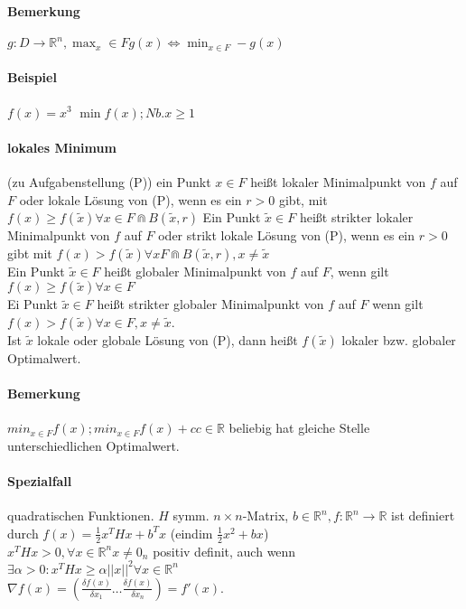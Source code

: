 \documentclass[ngerman,halfparskip]{scrartcl}
\theoremstyle{definition}
\def\R{\mathbb R}
\begin{document}
\paragraph*{Bemerkung} $g: D\rightarrow\R^n, \max_x\in F g(x) \Leftrightarrow \min_{x\in F} -g(x)$
\paragraph[1.1.3]{Beispiel}
$f(x)=x^3$ $\min f(x); Nb. x\geq 1$
\paragraph[Def 1.1.4]{lokales Minimum} (zu Aufgabenstellung (P)) ein Punkt $x\in F$ heißt lokaler Minimalpunkt von $f$ auf $F$ oder lokale Lösung von (P), wenn es ein $r>0$ gibt, mit $f(x)\geq f(\tilde x)\forall x\in F \Cap B(\tilde x,r)$ Ein Punkt $\tilde x\in F$ heißt strikter lokaler Minimalpunkt von $f$ auf $F$ oder strikt lokale Lösung von (P), wenn es ein $r>0$ gibt mit $f(x)>f(\tilde x)\forall x F\Cap B(\tilde x,r), x\neq \tilde x$ \\
Ein Punkt $\tilde{x} \in F$ heißt globaler Minimalpunkt von $f$ auf $F$, wenn gilt $f(x)\geq f(\tilde{x})\forall x\in F$\\
Ei Punkt $ \tilde x \in F$ heißt strikter globaler Minimalpunkt von $f$ auf $F$ wenn gilt $ f(x) >f(\tilde x) \forall x\in F, x\neq \tilde x$.\\
Ist $\tilde x$ lokale oder globale Lösung von (P), dann heißt $f(\tilde x)$ lokaler bzw. globaler Optimalwert.
\paragraph*{Bemerkung} $min_{x\in F} f(x); min_{x\in F} f(x)+c c\in\R$ beliebig hat gleiche Stelle unterschiedlichen Optimalwert.
\paragraph*{Spezialfall} quadratischen Funktionen. $H$ symm. $n\times n$-Matrix, $b\in\R^n, f: \R^n\rightarrow \R$ ist definiert durch $f(x)=\frac 12 x^THx+b^Tx$ (eindim $\frac 12 x^2 +bx$)\\
$x^THx>0, \forall x\in \R^n x\neq 0_n$ positiv definit, auch wenn $\exists\alpha >0: x^THx \geq \alpha ||x||^2\forall x\in\R^n$\\
$\nabla f(x)=(\frac{\delta f(x)}{\delta x_1} \ldots \frac{\delta f(x)}{\delta x_n})=f'(x)$.
\end{document}
